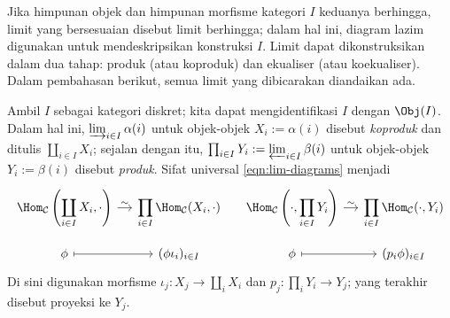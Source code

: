 Jika himpunan objek dan himpunan morfisme kategori $I$ keduanya berhingga, limit yang bersesuaian disebut limit berhingga; dalam hal ini, diagram lazim digunakan untuk mendeskripsikan konstruksi $I$. Limit dapat dikonstruksikan dalam dua tahap: produk (atau koproduk) dan ekualiser (atau koekualiser). Dalam pembahasan berikut, semua limit yang dibicarakan diandaikan ada.
\begin{asparaenum}
	\item Ambil $I$ sebagai kategori diskret; kita dapat mengidentifikasi $I$ dengan $\Obj(I)$. Dalam hal ini, $\varinjlim_{i \in I} \alpha(i)$ untuk objek-objek $X_i := \alpha(i)$ disebut \emph{koproduk} dan ditulis $\coprod_{i \in I} X_i$; sejalan dengan itu, $\prod_{i \in I} Y_i := \varprojlim_{i \in I} \beta(i)$ untuk objek-objek $Y_i := \beta(i)$ disebut \emph{produk}. Sifat universal \eqref{eqn:lim-diagrams} menjadi
		\[\begin{tikzcd}[row sep=small, column sep=small]
			\Hom_{\mathcal{C}} \left( \displaystyle\coprod_{i \in I} X_i, \cdot \right) \arrow[r, "\sim"] & \displaystyle\prod_{i \in I} \Hom_{\mathcal{C}}(X_i, \cdot) & \Hom_{\mathcal{C}} \left( \cdot, \displaystyle\prod_{i \in I} Y_i \right)  \arrow[r, "\sim"] & \displaystyle\prod_{i \in I} \Hom_{\mathcal{C}}(\cdot, Y_i) \\
			\phi \arrow[mapsto, r] & (\phi \iota_i)_{i \in I} & \phi \arrow[mapsto, r] & (p_i \phi)_{i \in I}
		\end{tikzcd}\]
		Di sini digunakan morfisme $\iota_j: X_j \to \coprod_i X_i$ dan $p_j: \prod_i Y_i \to Y_j$; yang terakhir disebut proyeksi ke $Y_j$.


\end{asparaenum}
